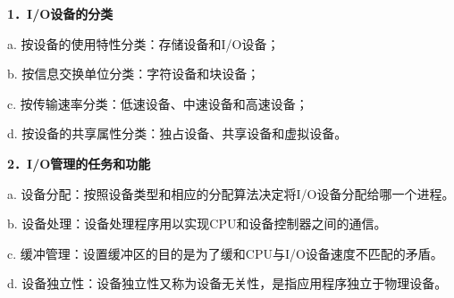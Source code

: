 \textbf{{1．I/O设备的分类}}

{a. 按设备的使用特性分类：存储设备和I/O设备；}

b. 按信息交换单位分类：字符设备和块设备；

c. 按传输速率分类：低速设备、中速设备和高速设备；

d. 按设备的共享属性分类：独占设备、共享设备和虚拟设备。

\textbf{{2．I/O管理的任务和功能}}

{a.
设备分配：}{按照设备类型和相应的分配算法决定将I/O设备分配给哪一个进程。}

{b. 设备处理：}{设备处理程序用以实现CPU和设备控制器之间的通信。}

{c.
缓冲管理：}{设置缓冲区的目的是为了缓和CPU与I/O设备速度不匹配的矛盾。}

{d.
设备独立性：}{设备独立性又称为设备无关性，是指应用程序独立于物理设备。}
